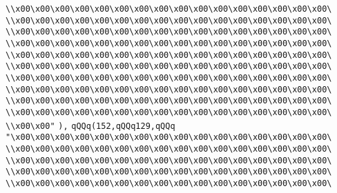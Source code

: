 \verb|\\x00\x00\x00\x00\x00\x00\x00\x00\x00\x00\x00\x00\x00\x00\x00\x00\|\newline
\verb|\\x00\x00\x00\x00\x00\x00\x00\x00\x00\x00\x00\x00\x00\x00\x00\x00\|\newline
\verb|\\x00\x00\x00\x00\x00\x00\x00\x00\x00\x00\x00\x00\x00\x00\x00\x00\|\newline
\verb|\\x00\x00\x00\x00\x00\x00\x00\x00\x00\x00\x00\x00\x00\x00\x00\x00\|\newline
\verb|\\x00\x00\x00\x00\x00\x00\x00\x00\x00\x00\x00\x00\x00\x00\x00\x00\|\newline
\verb|\\x00\x00\x00\x00\x00\x00\x00\x00\x00\x00\x00\x00\x00\x00\x00\x00\|\newline
\verb|\\x00\x00\x00\x00\x00\x00\x00\x00\x00\x00\x00\x00\x00\x00\x00\x00\|\newline
\verb|\\x00\x00\x00\x00\x00\x00\x00\x00\x00\x00\x00\x00\x00\x00\x00\x00\|\newline
\verb|\\x00\x00\x00\x00\x00\x00\x00\x00\x00\x00\x00\x00\x00\x00\x00\x00\|\newline
\verb|\\x00\x00\x00\x00\x00\x00\x00\x00\x00\x00\x00\x00\x00\x00\x00\x00\|\newline
\verb|\\x00\x00"|\newline
\verb|),|\newline
\verb|qQQq(152,qQQq129,qQQq|\newline
\verb|"\x00\x00\x00\x00\x00\x00\x00\x00\x00\x00\x00\x00\x00\x00\x00\x00\|\newline
\verb|\\x00\x00\x00\x00\x00\x00\x00\x00\x00\x00\x00\x00\x00\x00\x00\x00\|\newline
\verb|\\x00\x00\x00\x00\x00\x00\x00\x00\x00\x00\x00\x00\x00\x00\x00\x00\|\newline
\verb|\\x00\x00\x00\x00\x00\x00\x00\x00\x00\x00\x00\x00\x00\x00\x00\x00\|\newline
\verb|\\x00\x00\x00\x00\x00\x00\x00\x00\x00\x00\x00\x00\x00\x00\x00\x00\|\newline
